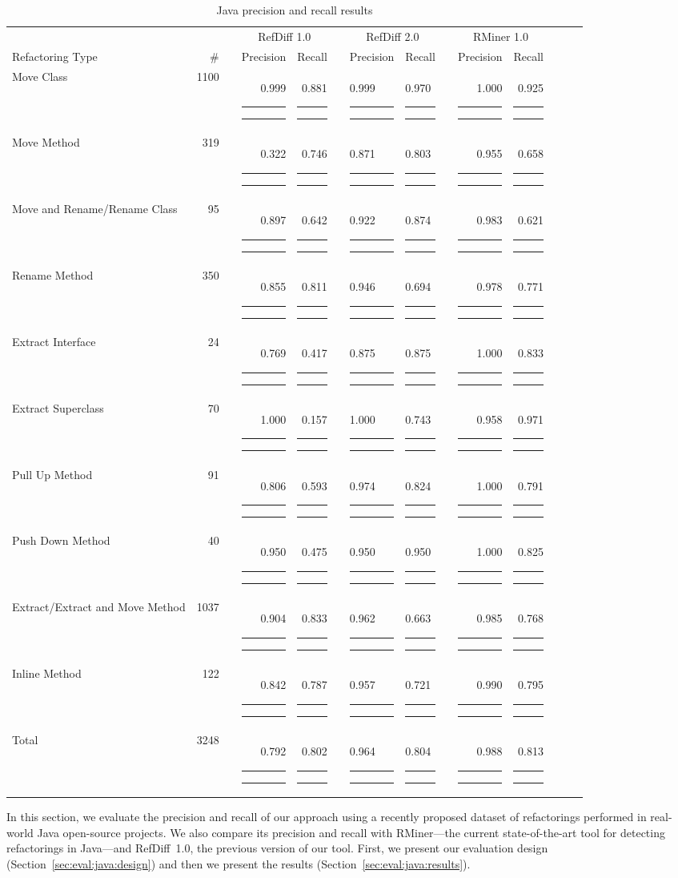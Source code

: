 \documentclass[10pt,journal,compsoc]{IEEEtran}
\newcommand\xbar[1]{#1 {\color{darkgray} \rule{\dimexpr #1pt * 16}{5.5pt}}{\color{lightgray} \rule{\dimexpr 16pt - (#1pt * 16)}{5.5pt}}}
\begin{document}
\begin{table}[htbp]
\renewcommand{\arraystretch}{1.2}
\caption{Java precision and recall results}
\label{TabResultJava}
\centering
\begin{tabular}{@{}lrlrrrlllrrrll@{}}
\toprule
 & & & \multicolumn{2}{c}{RefDiff 1.0} & & \multicolumn{2}{c}{RefDiff 2.0} & & \multicolumn{2}{c}{RMiner 1.0}\\
\cmidrule{4-5} \cmidrule{7-8} \cmidrule{10-11}
Refactoring Type & \# & & Precision & Recall & & Precision & Recall & & Precision & Recall \\
\midrule
Move Class & 1100 & & \xbar{0.999} & \xbar{0.881} & & \xbar{0.999} & \xbar{0.970} & & \xbar{1.000} & \xbar{0.925} \\
Move Method & 319 & & \xbar{0.322} & \xbar{0.746} & & \xbar{0.871} & \xbar{0.803} & & \xbar{0.955} & \xbar{0.658} \\
Move and Rename/Rename Class & 95 & & \xbar{0.897} & \xbar{0.642} & & \xbar{0.922} & \xbar{0.874} & & \xbar{0.983} & \xbar{0.621} \\
Rename Method & 350 & & \xbar{0.855} & \xbar{0.811} & & \xbar{0.946} & \xbar{0.694} & & \xbar{0.978} & \xbar{0.771} \\
Extract Interface & 24 & & \xbar{0.769} & \xbar{0.417} & & \xbar{0.875} & \xbar{0.875} & & \xbar{1.000} & \xbar{0.833} \\
Extract Superclass & 70 & & \xbar{1.000} & \xbar{0.157} & & \xbar{1.000} & \xbar{0.743} & & \xbar{0.958} & \xbar{0.971} \\
Pull Up Method & 91 & & \xbar{0.806} & \xbar{0.593} & & \xbar{0.974} & \xbar{0.824} & & \xbar{1.000} & \xbar{0.791} \\
Push Down Method & 40 & & \xbar{0.950} & \xbar{0.475} & & \xbar{0.950} & \xbar{0.950} & & \xbar{1.000} & \xbar{0.825} \\
Extract/Extract and Move Method & 1037 & & \xbar{0.904} & \xbar{0.833} & & \xbar{0.962} & \xbar{0.663} & & \xbar{0.985} & \xbar{0.768} \\
Inline Method & 122 & & \xbar{0.842} & \xbar{0.787} & & \xbar{0.957} & \xbar{0.721} & & \xbar{0.990} & \xbar{0.795} \\
\addlinespace
Total & 3248 & & \xbar{0.792} & \xbar{0.802} & & \xbar{0.964} & \xbar{0.804} & & \xbar{0.988} & \xbar{0.813} \\
\bottomrule
\end{tabular}
\end{table}


In this section, we evaluate the precision and recall of our approach using a recently proposed dataset of refactorings performed in real-world Java open-source projects. We also compare its precision and recall with RMiner---the current state-of-the-art tool for detecting refactorings in Java---and RefDiff~1.0, the previous version of our tool.
First, we present our evaluation design (Section~\ref{sec:eval:java:design}) and then we present the results (Section~\ref{sec:eval:java:results}).
\end{document}
